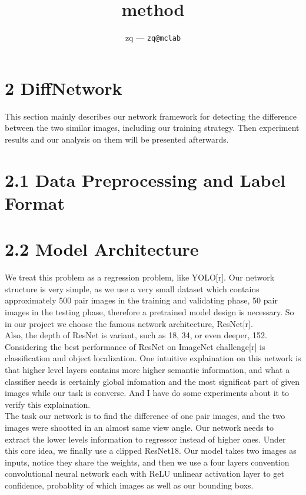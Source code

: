 \documentclass[12pt]{article}
\title{
	method
}
\author{
	zq --- \texttt{zq@mclab}
}
\begin{document}
\maketitle

\section{2 DiffNetwork}

This section mainly describes our network framework for detecting the difference between the two similar images, including our training strategy. Then experiment results and our analysis on them will be presented afterwards.\\

\section{2.1 Data Preprocessing and Label Format}


\section{2.2 Model Architecture}

We treat this problem as a regression problem, like YOLO[r]. Our network structure is very simple, as we use a very small dataset which contains approximately 500 pair images in the training and validating phase,  50 pair images in the testing phase, therefore a pretrained model design is necessary. So in our project we choose the famous network architecture, ResNet[r].\\

Also, the depth of ResNet is variant, such as 18, 34, or even deeper, 152. Considering the best performance of ResNet on ImageNet challenge[r] is classification and object localization. One intuitive explaination on this network is that higher level layers contains more higher semantic information, and what a classifier needs is certainly global infomation and the most significat part of given images while our task is converse. And I have do some experiments about it to verify this explaination.\\

The task our network is to find the difference of one pair images, and the two images were shootted in an almost same view angle. Our network needs to extract the lower levels information to regressor instead of higher ones. Under this core idea, we finally use a clipped ResNet18. Our model takes two images as inputs, notice they share the weights, and then we use a four layers convention convolutional neural network each with ReLU unlinear activation layer to get confidence, probablity of which images as well as our bounding boxs.\\
\end{document}
